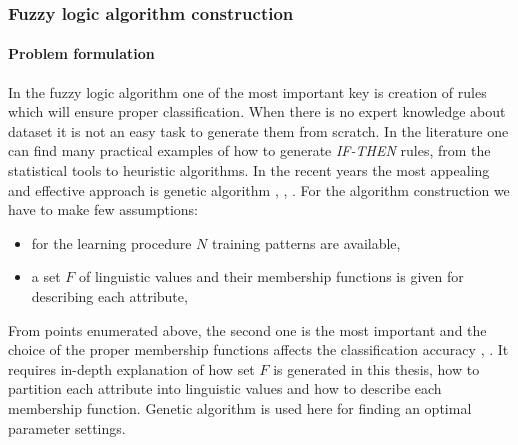 \subsubsection{Fuzzy logic algorithm construction}
\label{cha:Algorithm_construction_fuzzy_logic}
\paragraph{Problem formulation}
\label{cha:Fuzzy_logic_basic_problem_formulation}
In the fuzzy logic algorithm one of the most important key is creation of rules
which will ensure proper classification. When there is no expert knowledge about
dataset it is not an easy task to generate them from scratch. In the literature
one can find many practical examples of how to generate \textit{IF-THEN} rules, from
the statistical tools to heuristic algorithms. In the recent years the most appealing
and effective approach is genetic algorithm \cite{bib4}, \cite{bib13}, \cite{bib23}.
For the algorithm construction we have to make few assumptions:
\begin{itemize}
    \item for the learning procedure $N$ training patterns are available,
    \item a set $F$ of linguistic values and their membership functions is given
        for describing each attribute,
\end{itemize}

From points enumerated above, the second one is the most important and the choice of the proper membership
functions affects the classification accuracy \cite{bib17}, \cite{bib6}. It requires in-depth explanation
of how set $F$ is generated in this thesis, how to partition each attribute into 
linguistic values and how to describe each membership function. Genetic
algorithm is used here for finding an optimal parameter settings. 


